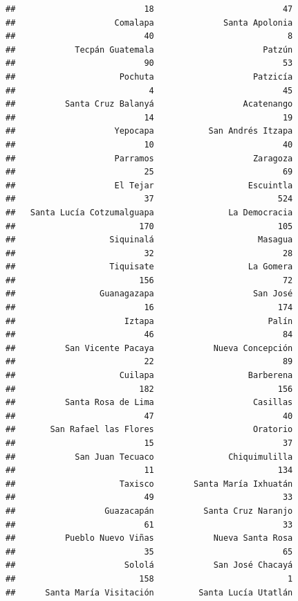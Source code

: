 \documentclass[
]{article}
\begin{document}
\begin{verbatim}
##                          18                          47 
##                    Comalapa              Santa Apolonia 
##                          40                           8 
##            Tecpán Guatemala                      Patzún 
##                          90                          53 
##                     Pochuta                    Patzicía 
##                           4                          45 
##          Santa Cruz Balanyá                  Acatenango 
##                          14                          19 
##                    Yepocapa           San Andrés Itzapa 
##                          10                          40 
##                    Parramos                    Zaragoza 
##                          25                          69 
##                    El Tejar                   Escuintla 
##                          37                         524 
##   Santa Lucía Cotzumalguapa               La Democracia 
##                         170                         105 
##                   Siquinalá                     Masagua 
##                          32                          28 
##                   Tiquisate                   La Gomera 
##                         156                          72 
##                 Guanagazapa                    San José 
##                          16                         174 
##                      Iztapa                       Palín 
##                          46                          84 
##          San Vicente Pacaya            Nueva Concepción 
##                          22                          89 
##                     Cuilapa                   Barberena 
##                         182                         156 
##          Santa Rosa de Lima                    Casillas 
##                          47                          40 
##       San Rafael las Flores                    Oratorio 
##                          15                          37 
##            San Juan Tecuaco               Chiquimulilla 
##                          11                         134 
##                     Taxisco        Santa María Ixhuatán 
##                          49                          33 
##                  Guazacapán          Santa Cruz Naranjo 
##                          61                          33 
##          Pueblo Nuevo Viñas            Nueva Santa Rosa 
##                          35                          65 
##                      Sololá            San José Chacayá 
##                         158                           1 
##      Santa María Visitación         Santa Lucía Utatlán 

\end{verbatim}
\end{document}

